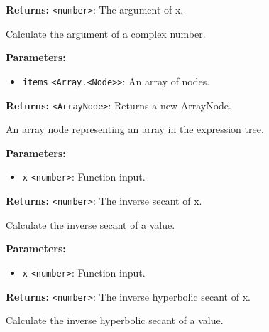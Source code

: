 \documentclass[12pt,a4paper]{article}
\begin{document}
\noindent \textbf{Returns:} \texttt{<number>}: The argument of \textasciigrave{}x\textasciigrave{}.

\noindent Calculate the argument of a complex number.

\vspace{5mm}
\noindent {}


\noindent \textbf{Parameters:}
\begin{itemize}
  \item \texttt{items} \texttt{<Array.<Node>>}: An array of nodes.
\end{itemize}

\noindent \textbf{Returns:} \texttt{<ArrayNode>}: Returns a new ArrayNode.

\noindent An array node representing an array in the expression tree.

\vspace{5mm}
\noindent {}


\noindent \textbf{Parameters:}
\begin{itemize}
  \item \texttt{x} \texttt{<number>}: Function input.
\end{itemize}

\noindent \textbf{Returns:} \texttt{<number>}: The inverse secant of \textasciigrave{}x\textasciigrave{}.

\noindent Calculate the inverse secant of a value.

\vspace{5mm}
\noindent {}


\noindent \textbf{Parameters:}
\begin{itemize}
  \item \texttt{x} \texttt{<number>}: Function input.
\end{itemize}

\noindent \textbf{Returns:} \texttt{<number>}: The inverse hyperbolic secant of \textasciigrave{}x\textasciigrave{}.

\noindent Calculate the inverse hyperbolic secant of a value.
\end{document}
